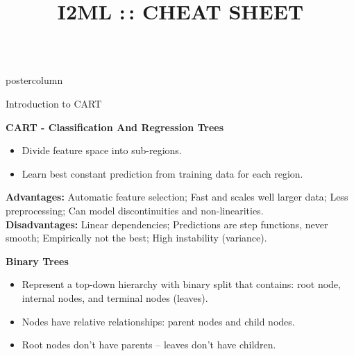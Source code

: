 \documentclass{beamer}
\title{I2ML :\,: CHEAT SHEET} %
\newlength{\columnheight} %
\begin{document}
\begin{frame}[fragile]{}
\begin{columns}
	\begin{column}{.31\textwidth}
		\begin{beamercolorbox}[center]{postercolumn}
			\begin{minipage}{.98\textwidth}
				\parbox[t][\columnheight]{\textwidth}{
					\begin{myblock}{Introduction to CART}

						\begin{codebox}
							\textbf{CART - \textbf{C}lassification \textbf{A}nd \textbf{R}egression \textbf{T}rees}
						\end{codebox}
						\begin{itemize}[$\bullet$]     
            \setlength{\itemindent}{+.3in}
                        \item Divide feature space into sub-regions.
                        \item Learn best constant prediction from training data for each region.
            \end{itemize}

            \textbf{Advantages:} Automatic feature selection; Fast and scales well larger data; Less preprocessing; Can model discontinuities and non-linearities.\\
            \textbf{Disadvantages:} Linear dependencies; Predictions are step functions, never smooth; Empirically not the best; High instability (variance). 			
          
          \begin{codebox}
          \textbf{Binary Trees}
          \end{codebox}
          \begin{itemize}[$\bullet$]     
            \setlength{\itemindent}{+.3in}
            \item Represent a top-down hierarchy with binary split that contains:
                 root node, internal nodes, and terminal nodes (leaves).
            \item Nodes have relative relationships: parent nodes and child nodes. 
            \item Root nodes don't have parents -- leaves don't have children.
          \end{itemize}


\end{myblock}}
\end{minipage}
\end{beamercolorbox}
\end{column}
\end{columns}
\end{frame}
\end{document}
